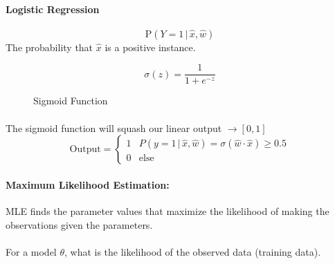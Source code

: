 \documentclass[letterpaper,12pt]{article}
\begin{document}
\paragraph{Logistic Regression}
\begin{center}
    
\[
    \mathrm{P}(Y=1\, |\, \hat{x}, \hat{w})
\]
The probability that $\hat{x}$ is a positive instance.

\end{center}

\[
    \sigma(z) = \frac{1}{1+e^{-z}}
\]
\begin{figure}
    \caption{Sigmoid Function}
    \centering
{}
\end{figure}

\paragraph{}The sigmoid function will squash our linear output $\to [0,1]$
\[ \mathrm{Output} = \begin{cases}
    1 & P(y=1 \, | \, \hat{x}, \hat{w}) = \sigma(\hat{w}\cdot \hat{x}) \ge 0.5 \\
    0 & \mathrm{else}
    \end{cases}
\]

\paragraph{Maximum Likelihood Estimation:} MLE finds the parameter values that maximize the likelihood
of making the observations given the parameters.
\paragraph{}For a model $\theta$, what is the likelihood of the observed data (training data).
\end{document}
